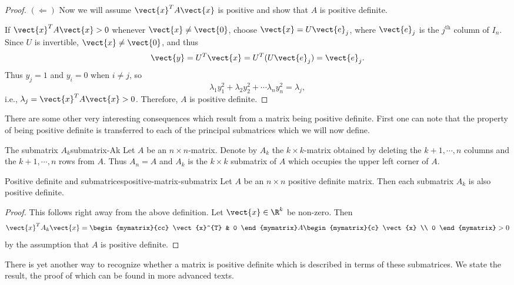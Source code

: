 \begin{proof}
$(\Leftarrow)$ Now we will assume $\vect{x}^T A \vect{x} $ is positive and show that $A$ is positive definite.

If $\vect{x}^TA\vect{x}>0$ whenever $\vect{x}\neq \vect{0}$,
choose $\vect{x}=U\vect{e}_j$, where $\vect{e}_j$ is the $j^{\mbox{th}}$
column of $I_n$.
Since $U$ is invertible, $\vect{x}\neq\vect{0}$, 
and thus
\[ \vect{y}=U^T\vect{x}=U^T(U\vect{e}_j) =\vect{e}_j.\]
Thus $y_j=1$ and $y_i=0$ when $i\neq j$, so
\[ \lambda_1 y_1^2 + \lambda_2 y_2^2 + \cdots \lambda_n y_n^2
=\lambda_j,\]
i.e., $\lambda_j=\vect{x}^TA\vect{x}>0$.
Therefore, $A$ is positive definite.
\end{proof}

There are some other very interesting consequences which result from a
matrix being positive definite. First one can note that the property of
being positive definite is transferred to each of the principal submatrices which we will now define.

\begin{definition}{The submatrix $A_k$}{submatrix-Ak}
Let $A$ be an $n\times n$-matrix. Denote by $A_{k}$ the $k\times k$-matrix
obtained by deleting the $k+1,\cdots ,n$ columns and the $k+1,\cdots ,n$
rows from $A$. Thus $A_{n}=A$ and $A_{k}$ is the $k\times k$ submatrix of $A$
which occupies the upper left corner of $A$.
\end{definition}

\begin{lemma}{Positive definite and submatrices}{positive-matrix-submatrix}
Let $A$ be an $n\times n$ positive definite matrix.  Then each submatrix $A_{k}$ is also positive definite.
\end{lemma}

\begin{proof}
This follows right away from the above definition. Let $\vect{x}\in \R^{k}$ be non-zero. Then 
\begin{equation*}
\vect{x}^{T}A_{k}\vect{x}=\begin{mymatrix}{cc}
\vect{x}^{T} & 0
\end{mymatrix} A\begin{mymatrix}{c}
\vect{x} \\ 
0
\end{mymatrix} >  0
\end{equation*}
by the assumption that $A$ is positive definite.
\end{proof}

There is yet another way to recognize whether a matrix is positive definite
which is described in terms of these submatrices. We state the result,  the proof
of which can be found in more advanced texts.

